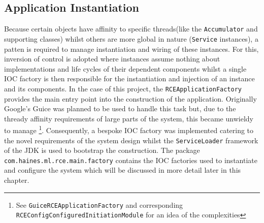 \documentclass[a4paper,11pt]{scrreprt}
\begin{document}
\subsection{Application Instantiation}
Because certain objects have affinity to specific threads(like the \verb|Accumulator| and supporting classes) whilst others are more global in nature (\verb|Service| instances), a patten is required to manage instantiation and wiring of these instances. For this, inversion of control\cite{ioc} is adopted where instances assume nothing about implementations and life cycles of their dependent components whilst a single IOC factory is then responsible for the instantiation and injection of an instance and its components. In the case of this project, the \verb|RCEApplicationFactory| provides the main entry point into the construction of the application. Originally Google's Guice\cite{guice} was planned to be used to handle this task but, due to the thready affinity requirements of large parts of the system, this became unwieldy to manage \footnote{See \verb|GuiceRCEApplicationFactory| and corresponding \verb|RCEConfigConfiguredInitiationModule| for an idea of the complexities}. Consequently, a bespoke IOC factory was implemented catering to the novel requirements of the system design whilst the \verb|ServiceLoader| framework of the JDK is used to bootstrap the construction. The package \verb|com.haines.ml.rce.main.factory| contains the IOC factories used to instantiate and configure the system which will be discussed in more detail later in this chapter.
\end{document}
